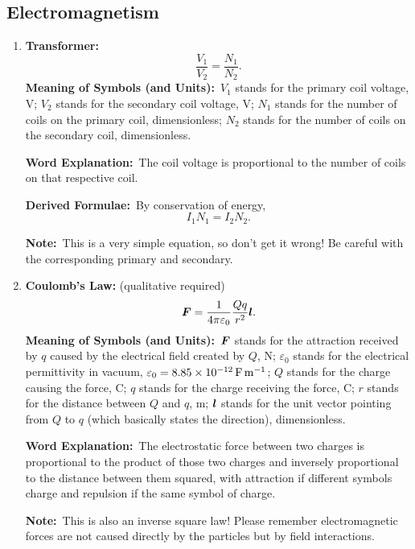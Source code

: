 \documentclass[8pt]{article}
\newcommand{\MeanSymb}{\textbf{Meaning of Symbols (and Units):}\ }
\newcommand{\WordExpl}{\textbf{Word Explanation:}\ }
\newcommand{\DeriForm}{\textbf{Derived Formulae:}\ }
\newcommand{\Note}{\textbf{Note:}\ }
\begin{document}
        \subsection{Electromagnetism}
            \begin{enumerate}
                \item \textbf{Transformer:}
                \[
                    \frac{V_1}{V_2} = \frac{N_1}{N_2}.
                \]
                \MeanSymb \(V_1\) stands for the primary coil voltage, \unit{\volt}; \(V_2\) stands for the secondary coil voltage, \unit{\volt}; \(N_1\) stands for the number of coils on the primary coil, dimensionless; \(N_2\) stands for the number of coils on the secondary coil, dimensionless.

                \WordExpl The coil voltage is proportional to the number of coils on that respective coil.

                \DeriForm By conservation of energy,
                \[
                    I_1 N_1 = I_2 N_2.
                \]

                \Note This is a very simple equation, so don't get it wrong! Be careful with the corresponding primary and secondary.

                \item \textbf{Coulomb's Law:} (qualitative required)
                \[
                    \boldsymbol{F} = \frac{1}{4 \pi \varepsilon_0} \frac{Q q}{r^2} \boldsymbol{l}.
                \]
                \MeanSymb \(\boldsymbol{F}\) stands for the attraction received by \(q\) caused by the electrical field created by \(Q\), \unit{\newton}; \(\varepsilon_0\) stands for the electrical permittivity in vacuum, \(\varepsilon_0 = \qty{8.85 e -12}{\farad \per \metre}\); \(Q\) stands for the charge causing the force, \unit{\coulomb}; \(q\) stands for the charge receiving the force, \unit{\coulomb}; \(r\) stands for the distance between \(Q\) and \(q\), \unit{\metre}; \(\boldsymbol{l}\) stands for the unit vector pointing from \(Q\) to \(q\) (which basically states the direction), dimensionless.

                \WordExpl The electrostatic force between two charges is proportional to the product of those two charges and inversely proportional to the distance between them squared, with attraction if different symbols charge and repulsion if the same symbol of charge.

                \Note This is also an inverse square law! Please remember electromagnetic forces are not caused directly by the particles but by field interactions.


\end{enumerate}
\end{document}
